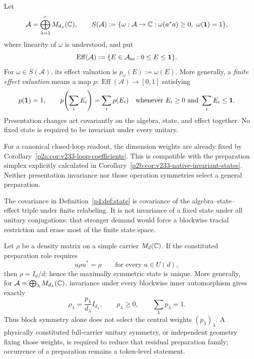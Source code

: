 \documentclass[12pt,a4paper]{article}
\begin{document}
\begin{definition}
\label{p4:def:state}
Let
\[
 \mathcal A=\bigoplus_{\lambda=1}^{r}M_{d_\lambda}(\mathbb{C}),
 \qquad
 S(\mathcal A)
 :=\{\omega:\mathcal A\to\mathbb{C}:
       \omega(a^*a)\ge0,\ \omega(\mathbf{1})=1\},
\]
where linearity of \(\omega\) is understood, and put
\[
 \operatorname{Eff}(\mathcal A)
 :=\{E\in\mathcal A_{\rm sa}:0\le E\le\mathbf{1}\}.
\]
For \(\omega\in S(\mathcal A)\), its effect valuation is
\(p_\omega(E):=\omega(E)\).  More generally, a \emph{finite effect valuation}
means a map \(p:\operatorname{Eff}(\mathcal A)\to[0,1]\) satisfying
\[
 p(\mathbf{1})=1,
 \qquad
 p\!\left(\sum_iE_i\right)=\sum_i p(E_i)
 \quad\text{whenever }E_i\ge0\text{ and }\sum_iE_i\le\mathbf{1}.
\]
Presentation changes act covariantly on the algebra, state, and effect
together.  No fixed state is required to be invariant under every unitary.
\end{definition}

For a canonical closed-loop readout, the dimension weights are
already fixed by Corollary~\ref{p2a:cor:v233-loop-coefficients}.
This is compatible with the preparation simplex explicitly calculated
in Corollary~\ref{p2b:cor:v233-native-invariant-states}.
Neither presentation invariance nor those operation symmetries
select a general preparation.

\begin{remark}
The covariance in Definition~\ref{p4:def:state} is covariance of the
algebra--state--effect triple under finite relabeling.  It is not invariance of
a fixed state under all unitary conjugations; that stronger demand would force
a blockwise tracial restriction and erase most of the finite state space.
\end{remark}

\begin{proposition}
\label{p4:prop:symmetry-selected-preparation}
Let \(\rho\) be a density matrix on a simple carrier \(M_d(\mathbb{C})\).  If the
constituted preparation role requires
\[
 u\rho u^*=\rho\qquad\text{for every }u\in U(d),
\]
then \(\rho=I_d/d\); hence the maximally symmetric state is unique.  More
generally, for
\(\mathcal A=\bigoplus_\lambda M_{d_\lambda}(\mathbb{C})\), invariance under every
blockwise inner automorphism gives exactly
\[
 \rho_\lambda=\frac{p_\lambda}{d_\lambda}I_{d_\lambda},
 \qquad p_\lambda\ge0,
 \qquad \sum_\lambda p_\lambda=1.
\]
Thus block symmetry alone does not select the central weights
\((p_\lambda)_\lambda\).  A physically constituted full-carrier unitary
symmetry, or independent geometry fixing those weights, is required to reduce
that residual preparation family; occurrence of a preparation remains a
token-level statement.
\end{proposition}
\end{document}
